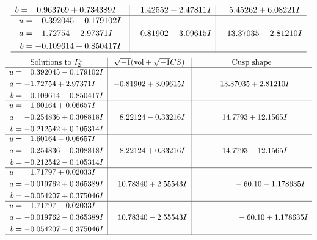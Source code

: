\documentclass[1p]{elsarticle_modified}
\theoremstyle{definition}
\newcommand{\I}{\sqrt{-1}}
\begin{document}
$$\begin{array}{c|c|c}
\begin{aligned}
b &= \phantom{-}0.963769 + 0.734389 I\end{aligned}
 & \phantom{-}1.42552 - 2.47811 I & \phantom{-}5.45262 + 6.08221 I \\ \hline\begin{aligned}
u &= \phantom{-}0.392045 + 0.179102 I \\
a &= -1.72754 - 2.97371 I \\
b &= -0.109614 + 0.850417 I\end{aligned}
 & -0.81902 - 3.09615 I & \phantom{-}13.37035 - 2.81210 I\\
 \hline 
 \end{array}$$\newpage$$\begin{array}{c|c|c}  
\text{Solutions to }I^u_{2}& \I (\text{vol} + \sqrt{-1}CS) & \text{Cusp shape}\\
 \hline 
\begin{aligned}
u &= \phantom{-}0.392045 - 0.179102 I \\
a &= -1.72754 + 2.97371 I \\
b &= -0.109614 - 0.850417 I\end{aligned}
 & -0.81902 + 3.09615 I & \phantom{-}13.37035 + 2.81210 I \\ \hline\begin{aligned}
u &= \phantom{-}1.60164 + 0.06657 I \\
a &= -0.254836 + 0.308818 I \\
b &= -0.212542 + 0.105314 I\end{aligned}
 & \phantom{-}8.22124 - 0.33216 I & \phantom{-}14.7793 + 12.1565 I \\ \hline\begin{aligned}
u &= \phantom{-}1.60164 - 0.06657 I \\
a &= -0.254836 - 0.308818 I \\
b &= -0.212542 - 0.105314 I\end{aligned}
 & \phantom{-}8.22124 + 0.33216 I & \phantom{-}14.7793 - 12.1565 I \\ \hline\begin{aligned}
u &= \phantom{-}1.71797 + 0.02033 I \\
a &= -0.019762 + 0.365389 I \\
b &= -0.054207 + 0.375046 I\end{aligned}
 & \phantom{-}10.78340 + 2.55543 I & \phantom{-0.000000 }      -6
0. 10   - 1.178635 I \\ \hline\begin{aligned}
u &= \phantom{-}1.71797 - 0.02033 I \\
a &= -0.019762 - 0.365389 I \\
b &= -0.054207 - 0.375046 I\end{aligned}
 & \phantom{-}10.78340 - 2.55543 I & \phantom{-0.000000 -}     -6
0. 10   + 1.178635 I\\
 \hline 
 \end{array}$$\newpage
\end{document}

